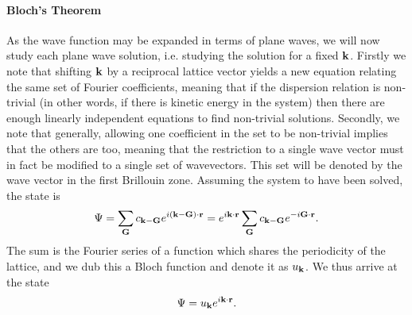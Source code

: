 \paragraph{Bloch's Theorem}
As the wave function may be expanded in terms of plane waves, we will now study each plane wave solution, i.e. studying the solution for a fixed $\vb{k}$. Firstly we note that shifting $\vb{k}$ by a reciprocal lattice vector yields a new equation relating the same set of Fourier coefficients, meaning that if the dispersion relation is non-trivial (in other words, if there is kinetic energy in the system) then there are enough linearly independent equations to find non-trivial solutions. Secondly, we note that generally, allowing one coefficient in the set to be non-trivial implies that the others are too, meaning that the restriction to a single wave vector must in fact be modified to a single set of wavevectors. This set will be denoted by the wave vector in the first Brillouin zone. Assuming the system to have been solved, the state is
\begin{align*}
	\Psi = \sum\limits_{\vb{G}}c_{\vb{k} - \vb{G}}e^{i(\vb{k} - \vb{G})\cdot\vb{r}} = e^{i\vb{k}\cdot\vb{r}}\sum\limits_{\vb{G}}c_{\vb{k} - \vb{G}}e^{-i\vb{G}\cdot\vb{r}}.
\end{align*}
The sum is the Fourier series of a function which shares the periodicity of the lattice, and we dub this a Bloch function and denote it as $u_{\vb{k}}$. We thus arrive at the state
\begin{align*}
	\Psi = u_{\vb{k}}e^{i\vb{k}\cdot\vb{r}}.
\end{align*}